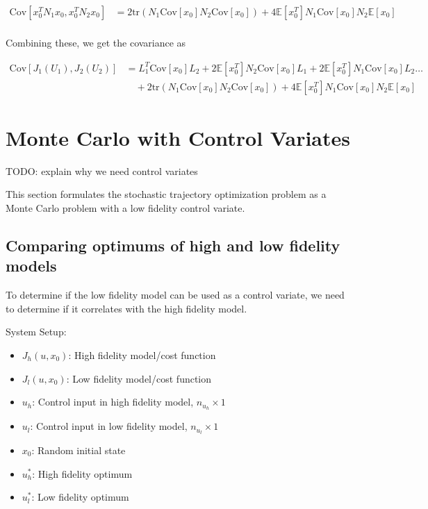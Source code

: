 \documentclass{article}
\begin{document}
$$
\begin{aligned}
  \text{Cov}[x_0^T N_1 x_0, x_0^T N_2 x_0] &= 2 \text{tr}(N_1 \text{Cov}[x_0] N_2 \text{Cov}[x_0]) + 4 \mathbb{E}[x_0^T]N_1\text{Cov}[x_0]N_2\mathbb{E}[x_0] \\
\end{aligned}
$$

Combining these, we get the covariance as

\begin{equation}
  \begin{aligned}
    \text{Cov}[J_1(U_1), J_2(U_2)] &= L_1^T \text{Cov}[x_0] L_2 + 2 \mathbb{E}[x_0^T] N_2 \text{Cov}[x_0] L_1 + 2 \mathbb{E}[x_0^T] N_1 \text{Cov}[x_0] L_2 \hdots \\
    & \quad + 2 \text{tr}(N_1 \text{Cov}[x_0] N_2 \text{Cov}[x_0]) + 4 \mathbb{E}[x_0^T]N_1\text{Cov}[x_0]N_2\mathbb{E}[x_0]
  \end{aligned}
\end{equation}

\section{Monte Carlo with Control Variates}
TODO: explain why we need control variates

This section formulates the stochastic trajectory optimization problem as a Monte Carlo problem with a low fidelity control variate.

\subsection{Comparing optimums of high and low fidelity models} \label{comp_opt}

To determine if the low fidelity model can be used as a control variate, we need to determine if it correlates with the high fidelity model.

System Setup:
\begin{itemize}
  \item $J_h(u, x_0)$: High fidelity model/cost function
  \item $J_l(u, x_0)$: Low fidelity model/cost function
  \item $u_h$: Control input in high fidelity model, $n_{u_h} \times 1$
  \item $u_l$: Control input in low fidelity model, $n_{u_l} \times 1$
  \item $x_0$: Random initial state
  \item $u_h^*$: High fidelity optimum
  \item $u_l^*$: Low fidelity optimum
\end{itemize}
\end{document}

